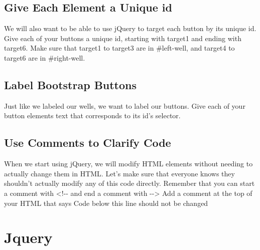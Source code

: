 \documentclass{article}%
\begin{document}
%
\subsection{Give Each Element a Unique id}%
\label{subsec:GiveEachElementaUniqueid}%
We will also want to be able to use jQuery to target each button by its unique id.\newline%
Give each of your buttons a unique id, starting with target1 and ending with target6.\newline%
Make sure that target1 to target3 are in \#left{-}well, and target4 to target6 are in \#right{-}well.\newline%

%
\subsection{Label Bootstrap Buttons}%
\label{subsec:LabelBootstrapButtons}%
Just like we labeled our wells, we want to label our buttons.\newline%
Give each of your button elements text that corresponds to its id's selector.\newline%

%
\subsection{Use Comments to Clarify Code}%
\label{subsec:UseCommentstoClarifyCode}%
When we start using jQuery, we will modify HTML elements without needing to actually change them in HTML.\newline%
Let's make sure that everyone knows they shouldn't actually modify any of this code directly.\newline%
Remember that you can start a comment with <!{-}{-} and end a comment with {-}{-}>\newline%
Add a comment at the top of your HTML that says Code below this line should not be changed\newline%

%
\newpage%
\section{Jquery}%
\label{sec:Jquery}%
\end{document}
